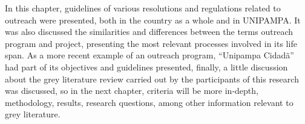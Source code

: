 In this chapter, guidelines of various resolutions and regulations related to outreach were presented, both in the country as a whole and in \ac{UNIPAMPA}.
It was also discussed the similarities and differences between the terms outreach program and project, presenting the most relevant processes involved in its life span.
As a more recent example of an outreach program, ``Unipampa Cidadã'' had part of its objectives and guidelines presented, finally, a little discussion about the grey literature review carried out by the participants of this research was discussed, so in the next chapter, criteria will be more in-depth, methodology, results, research questions, among other information relevant to grey literature.
